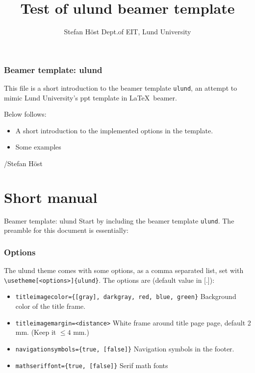\documentclass[aspectratio=1610]{beamer}
\title[ulund beamer]{Test of ulund beamer template}
\author[S. Höst]{%
  Stefan Höst\newline
  Dept.\@ of EIT, Lund University}
\begin{document}
\begin{frame}[plain]%
  \titlepage
\end{frame}

\begin{frame}
  \frametitle{Beamer template: ulund}
  This file is a short introduction to the beamer template \texttt{ulund}, an attempt to mimic Lund University's ppt template in \LaTeX\ beamer.

Below follows:
\begin{itemize}
\item A short introduction to the implemented options in the template. 
\item Some examples
\end{itemize}

/Stefan Höst
\end{frame}


\section{Short manual}

\begin{frame}[fragile]{Beamer template: ulund}
  Start by including the beamer template \verb|ulund|. The preamble for this document is essentially: 
\end{frame}

\begin{frame}[fragile]
  \frametitle{Options}
  The ulund theme comes with some options, as a comma separated list, set with
  \verb|\usetheme[<options>]{ulund}|.\newline
  The options are (default value in [.]):
  \begin{itemize}
  \item \verb|titleimagecolor={[gray], darkgray, red, blue, green}|\newline
    Background color of the title frame.
  \item \verb|titleimagemargin=<distance>| \newline
    White frame around title page page, default 2 mm. (Keep it $\leq 4$ mm.)
  \item \verb|navigationsymbols={true, [false]}|\newline
    Navigation symbols in the footer.
  \item \verb|mathseriffont={true, [false]}|\newline
    Serif math fonts
  \end{itemize}
\end{frame}
\end{document}
